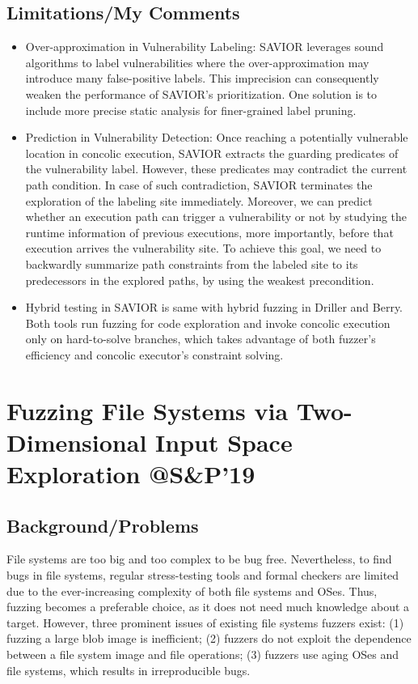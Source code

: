 \subsection{Limitations/My Comments}
\begin{itemize}
    \item Over-approximation in Vulnerability Labeling: SAVIOR leverages sound algorithms
to label vulnerabilities where the over-approximation may
introduce many false-positive labels. This imprecision can
consequently weaken the performance of SAVIOR's prioritization. 
One solution is to include more precise
static analysis for finer-grained label pruning.
    \item Prediction in Vulnerability Detection: Once reaching a
potentially vulnerable location in concolic execution,
SAVIOR extracts the guarding predicates of the vulnerability
label. However, these predicates may contradict the current
path condition. In case of such contradiction, SAVIOR terminates
the exploration of the labeling site immediately.
Moreover, we can predict whether an execution
path can trigger a vulnerability or not by studying the
runtime information of previous executions, more importantly,
before that execution arrives the vulnerability site. To
achieve this goal, we need to backwardly summarize
path constraints from the labeled site to its predecessors in
the explored paths, by using the weakest precondition.
    \item Hybrid testing in SAVIOR is same with hybrid fuzzing in Driller and Berry. Both tools run fuzzing for code exploration and invoke concolic execution only on
hard-to-solve branches, which takes advantage of both fuzzer's
efficiency and concolic executor's constraint solving.
\end{itemize}
\newpage
\section{Fuzzing File Systems via Two-Dimensional Input Space Exploration @S\&P'19}
\subsection{Background/Problems}
File systems are too big and too complex to be bug free. Nevertheless, to find bugs in file systems, regular stress-testing tools and formal checkers are limited due to the ever-increasing complexity of both file systems and OSes. Thus, fuzzing becomes a preferable choice, as it does not need much knowledge about a target. However,
three prominent issues of existing file systems fuzzers exist: 
(1) fuzzing a large blob image is inefficient; 
(2) fuzzers do not exploit the dependence
between a file system image and file operations; 
(3) fuzzers use aging OSes and file systems, which results in
irreproducible bugs.

